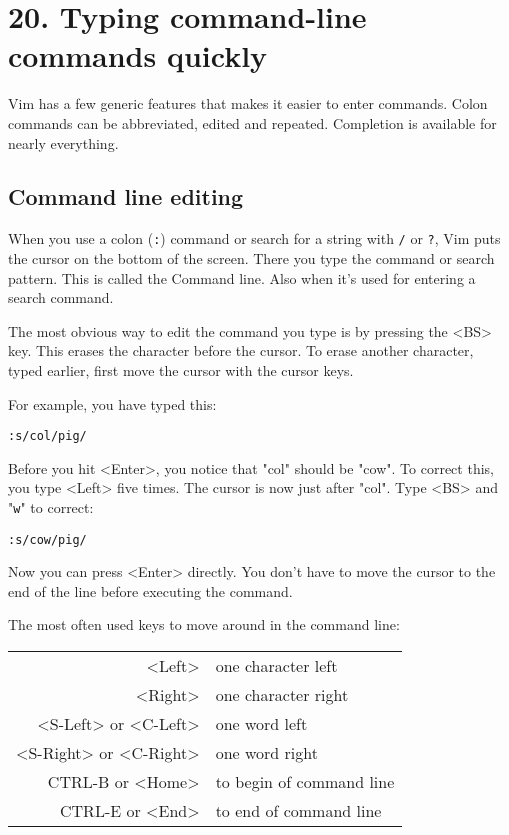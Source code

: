 \section{20. Typing command-line commands quickly}
Vim has a few generic features that makes it easier to enter commands.  Colon
commands can be abbreviated, edited and repeated.  Completion is available for
nearly everything.
\subsection{Command line editing}
When you use a colon (\verb!:!) command or search for a string with \verb!/! or \verb!?!, Vim puts the cursor on the bottom of the screen.
There you type the command or search pattern.
This is called the Command line.
Also when it's used for entering a search command.

The most obvious way to edit the command you type is by pressing the <BS> key.
This erases the character before the cursor.
To erase another character, typed earlier, first move the cursor with the cursor keys.

For example, you have typed this:

\begin{Verbatim}[samepage=true]
 :s/col/pig/
\end{Verbatim}

Before you hit <Enter>, you notice that "col" should be "cow".
To correct this, you type <Left> five times.
The cursor is now just after "col".
Type <BS> and "\verb!w!" to correct:

\begin{Verbatim}[samepage=true]
 :s/cow/pig/
\end{Verbatim}

Now you can press <Enter> directly.
You don't have to move the cursor to the end of the line before executing the command.

The most often used keys to move around in the command line:

\begin{center} \begin{longtable}{r l}
				<Left> & one character left \\
				<Right> & one character right\\
				<S-Left> or <C-Left> & one word left\\
				<S-Right> or <C-Right> & one word right\\
				CTRL-B or <Home> & to begin of command line\\
				CTRL-E or <End> & to end of command line\\
\end{longtable} \end{center}

